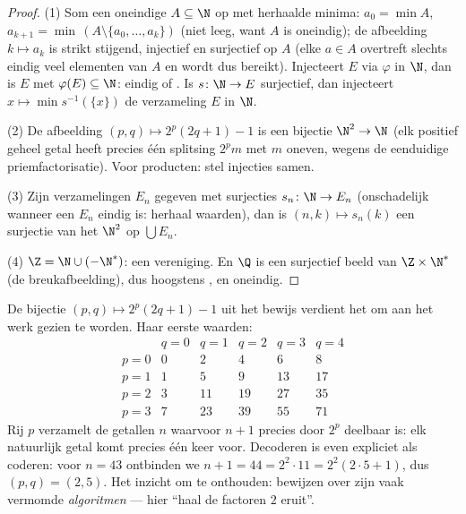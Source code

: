 \begin{proof}
(1) Som een oneindige $A \subseteq \N$ op met herhaalde minima:
$a_0 = \min A$, $a_{k+1} = \min\,(A \setminus \{a_0, \dots,
a_k\})$ (niet leeg, want $A$ is oneindig); de afbeelding $k
\mapsto a_k$ is strikt stijgend, injectief en surjectief op $A$
(elke $a \in A$ overtreft slechts eindig veel elementen van $A$ en
wordt dus bereikt). Injecteert $E$ via $\varphi$ in $\N$, dan is
$E$  met $\varphi(E) \subseteq \N$: eindig of
. Is $s \colon \N \to E$ surjectief, dan injecteert $x
\mapsto \min s^{-1}(\{x\})$ de verzameling $E$ in $\N$.

(2) De afbeelding $(p, q) \mapsto 2^p(2q + 1) - 1$ is een bijectie
$\N^2 \to \N$ (elk positief geheel getal heeft precies één
splitsing $2^p m$ met $m$ oneven, wegens de eenduidige
priemfactorisatie). Voor producten: stel injecties samen.

(3) Zijn verzamelingen $E_n$ gegeven met surjecties $s_n \colon \N
\to E_n$ (onschadelijk wanneer een $E_n$ eindig is: herhaal
waarden), dan is $(n, k) \mapsto s_n(k)$ een surjectie van het
 $\N^2$ op $\bigcup E_n$.

(4) $\Z = \N \cup (-\N^*)$: een  vereniging. En $\Q$ is
een surjectief beeld van $\Z \times \N^*$ (de breukafbeelding),
dus hoogstens , en oneindig.
\end{proof}

\begin{example}\label{ex:b2:structures:pairing}
De bijectie $(p, q) \mapsto 2^p(2q + 1) - 1$ uit het bewijs
verdient het om aan het werk gezien te worden. Haar eerste
waarden:
\[
\begin{array}{c|ccccc}
 & q = 0 & q = 1 & q = 2 & q = 3 & q = 4\\
\hline
p = 0 & 0 & 2 & 4 & 6 & 8\\
p = 1 & 1 & 5 & 9 & 13 & 17\\
p = 2 & 3 & 11 & 19 & 27 & 35\\
p = 3 & 7 & 23 & 39 & 55 & 71
\end{array}
\]
Rij $p$ verzamelt de getallen $n$ waarvoor $n + 1$ precies door
$2^p$ deelbaar is: elk natuurlijk getal komt precies één keer
voor. Decoderen is even expliciet als coderen: voor $n = 43$
ontbinden we $n + 1 = 44 = 2^2\cdot 11 = 2^2(2\cdot5 + 1)$, dus
$(p, q) = (2, 5)$. Het inzicht om te onthouden: bewijzen over
 zijn vaak vermomde \emph{algoritmen} --- hier
``haal de factoren $2$ eruit''.
\end{example}


